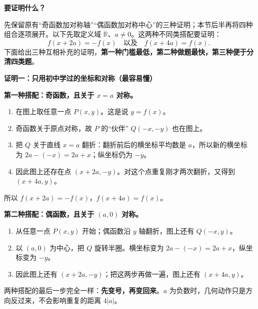 \clearpage
\begin{proofbox}
\textbf{\textcolor{CProof}{要证明什么？}}

先保留原有“奇函数加对称轴”“偶函数加对称中心”的三种证明；本节后半再将四种组合逐项展开。以下先取定义域 $\mathbb R$、$a\ne0$。这两种不同类搭配要证明：
\[
\boxed{f(x+2a)=-f(x)}\quad\text{以及}\quad\boxed{f(x+4a)=f(x)}.
\]
下面给出三种互相补充的证明，\textbf{第一种门槛最低，第二种做题最快，第三种便于分清四类题}。

\medskip
\textbf{\textcolor{CProof}{证明一：只用初中学过的坐标和对称（最容易懂）}}



\textbf{第一种搭配：奇函数，且关于 $x=a$ 对称。}
\begin{enumerate}[leftmargin=*,itemsep=0.3em]
 \item 在图上取任意一点 $P(x,y)$。这是说 $y=f(x)$。
 \item 奇函数关于原点对称，故 $P$ 的“伙伴” $Q(-x,-y)$ 也在图上。
 \item 把 $Q$ 关于直线 $x=a$ 翻折：翻折前后的横坐标平均数是 $a$，所以新的横坐标为 $2a-(-x)=2a+x$；纵坐标仍为 $-y$。
 \item 因此图上还存在点 $(x+2a,-y)$。对这个点重复刚才两次翻折，又得到 $(x+4a,y)$。
\end{enumerate}
所以 $f(x+2a)=-f(x)$，$f(x+4a)=f(x)$。

\end{proofbox}\clearpage\begin{proofbox}

\textbf{第二种搭配：偶函数，且关于 $(a,0)$ 对称。}
\begin{enumerate}[leftmargin=*,itemsep=0.3em]
 \item 从任意一点 $P(x,y)$ 开始；偶函数沿 $y$ 轴翻折，图上还有 $Q(-x,y)$。
 \item 以 $(a,0)$ 为中心，把 $Q$ 旋转半圈。横坐标变为 $2a-(-x)=2a+x$，纵坐标变为 $-y$。
 \item 因此图上还有 $(x+2a,-y)$；把这两步再做一遍，图上还有 $(x+4a,y)$。
\end{enumerate}
两种搭配的最后一步完全一样：\textbf{先变号，再变回来}。$a$ 为负数时，几何动作只是方向反过来，不会影响重复的距离 $4|a|$。

\medskip

\end{proofbox}
\clearpage
